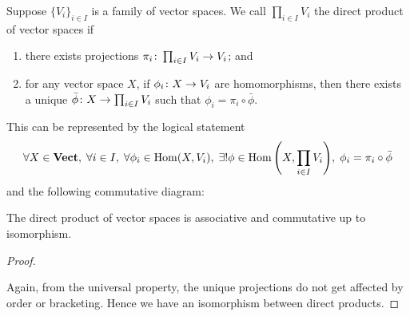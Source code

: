 \begin{definition}
    Suppose \({\{V_i\}}_{i \in I}\) is a family of vector spaces.
    We call \(\prod_{i \in I} V_i\) the direct product of vector spaces if
    \begin{enumerate}[label={(\roman*)}, itemsep=0mm]
        \item there exists projections \(\pi_i\colon\prod_{i \in I} V_i\to V_i\); and
        \item for any vector space \(X\), if \(\phi_i\colon X\to V_i\) are homomorphisms,
            then there exists a unique \(\bar{\phi}\colon X\to\prod_{i \in I} V_i\)
            such that \(\phi_i = \pi_i\circ\bar{\phi}\).
    \end{enumerate}

    This can be represented by the logical statement
    \begin{equation*}
        \forall X \in \mathbf{Vect},\;
        \forall i \in I,\;
        \forall \phi_i \in \operatorname{Hom}(X,V_i),\;
        \exists! \phi \in \operatorname{Hom}\qty(X,\prod_{i \in I} V_i),\;
        \phi_i = \pi_i \circ \bar{\phi}
    \end{equation*}
    and the following commutative diagram:
    \begin{center}
    \end{center}
\end{definition}

\begin{theorem}
    The direct product of vector spaces is associative and commutative up to isomorphism.
\end{theorem}
\begin{proof}
    \begin{center}
    \end{center}
    Again, from the universal property,
    the unique projections do not get affected by order or bracketing.
    Hence we have an isomorphism between direct products.
\end{proof}

